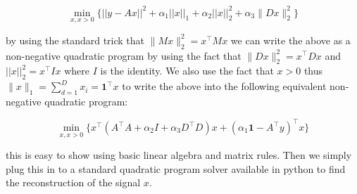 \documentclass[10pt,a4paper]{article}
\begin{document}
\begin{equation}
\min_{x,x>0} \Big\{ ||y-Ax||^2 + \alpha_1 ||x||_1 + \alpha_2 ||x||_2^2 + \alpha_3 \| D x\|^2_2 \Big\}
\end{equation}

by using the standard trick that $\| Mx\|^2_2 = x^\top M x$ we can write the above as a non-negative quadratic program by using the fact that $\| D x\|^2_2 = x^\top D x$ and $||x||_2^2 = x^\top I x$ where $I$ is the identity. We also use the fact that $x>0$ thus $\| x \|_1 = \sum^D_{d=1} x_i = \boldsymbol{1}^\top x$ to write the above into the following equivalent non-negative quadratic program:

\begin{equation}
\min_{x,x>0} \Big\{ x^{\top}\left( A^\top A + \alpha_2 I + \alpha_3 D^\top D \right)x + (\alpha_1 \boldsymbol{1} - A^\top y)^\top x \Big\}
\end{equation}

this is easy to show using basic linear algebra and matrix rules. Then we simply plug this in to a standard quadratic program solver available in python to find the reconstruction of the signal $x$.
\end{document}
